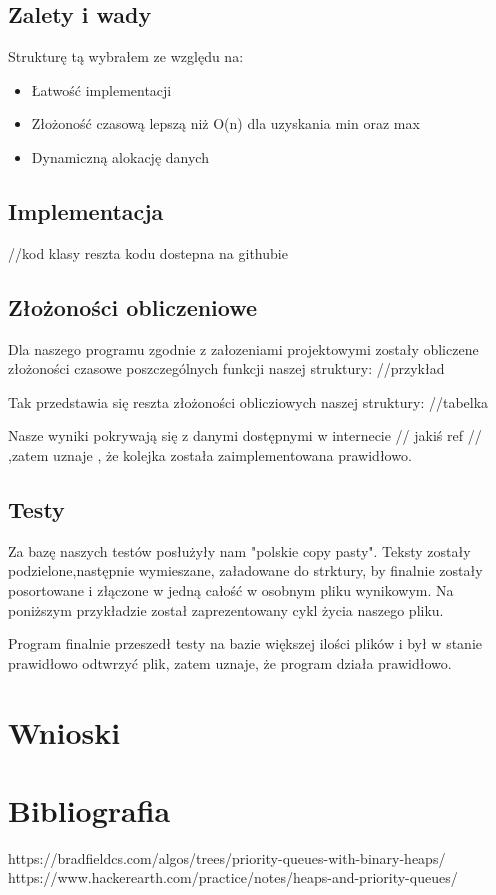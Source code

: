\documentclass{article}
\begin{document}
\subsection{Zalety i wady}
Strukturę tą wybrałem ze względu na:
\begin{itemize}
    \item Łatwość implementacji
    \item Złożoność czasową lepszą niż O(n) dla uzyskania min oraz max
    \item Dynamiczną alokację danych
\end{itemize}


\subsection{Implementacja}


//kod klasy reszta kodu dostepna na githubie
\subsection{Złożoności obliczeniowe}
Dla naszego programu zgodnie z załozeniami projektowymi zostały obliczene złożoności czasowe poszczególnych 
funkcji naszej struktury:
//przykład

Tak przedstawia się reszta złożoności oblicziowych naszej struktury:
//tabelka

Nasze wyniki pokrywają się z danymi dostępnymi w internecie // jakiś ref // ,zatem uznaje , że kolejka
została zaimplementowana prawidłowo.


\subsection{Testy}
Za bazę naszych testów posłużyły nam "polskie copy pasty". Teksty zostały podzielone,następnie wymieszane, załadowane do strktury,
by finalnie zostały posortowane i złączone w jedną całość w osobnym pliku wynikowym. Na poniższym przykładzie
został zaprezentowany cykl życia naszego pliku.



Program finalnie przeszedł testy na bazie większej ilości plików i był w stanie prawidłowo odtwrzyć plik, zatem
uznaje, że program działa prawidłowo.

\section{Wnioski}
\section{Bibliografia}
https://bradfieldcs.com/algos/trees/priority-queues-with-binary-heaps/
https://www.hackerearth.com/practice/notes/heaps-and-priority-queues/
\end{document}
